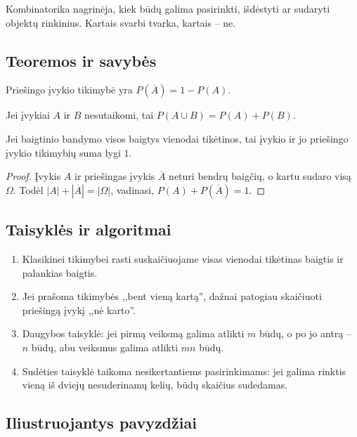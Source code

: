 \begin{apibreztis}
Kombinatorika nagrinėja, kiek būdų galima pasirinkti, išdėstyti ar sudaryti objektų rinkinius. Kartais svarbi tvarka, kartais -- ne.
\end{apibreztis}

\subsection{Teoremos ir savybės}

\begin{savybe}
Priešingo įvykio tikimybė yra $P(\overline A)=1-P(A)$.
\end{savybe}

\begin{savybe}
Jei įvykiai $A$ ir $B$ nesutaikomi, tai $P(A\cup B)=P(A)+P(B)$.
\end{savybe}

\begin{teorema}
Jei baigtinio bandymo visos baigtys vienodai tikėtinos, tai įvykio ir jo priešingo įvykio tikimybių suma lygi $1$.
\end{teorema}
\begin{proof}
Įvykis $A$ ir priešingas įvykis $\overline A$ neturi bendrų baigčių, o kartu sudaro visą $\Omega$. Todėl $|A|+|\overline A|=|\Omega|$, vadinasi, $P(A)+P(\overline A)=1$.
\end{proof}

\subsection{Taisyklės ir algoritmai}

\begin{enumerate}
\item Klasikinei tikimybei rasti suskaičiuojame visas vienodai tikėtinas baigtis ir palankias baigtis.
\item Jei prašoma tikimybės ,,bent vieną kartą'', dažnai patogiau skaičiuoti priešingą įvykį ,,nė karto''.
\item Daugybos taisyklė: jei pirmą veiksmą galima atlikti $m$ būdų, o po jo antrą -- $n$ būdų, abu veiksmus galima atlikti $mn$ būdų.
\item Sudėties taisyklė taikoma nesikertantiems pasirinkimams: jei galima rinktis vieną iš dviejų nesuderinamų kelių, būdų skaičius sudedamas.
\end{enumerate}

\subsection{Iliustruojantys pavyzdžiai}

